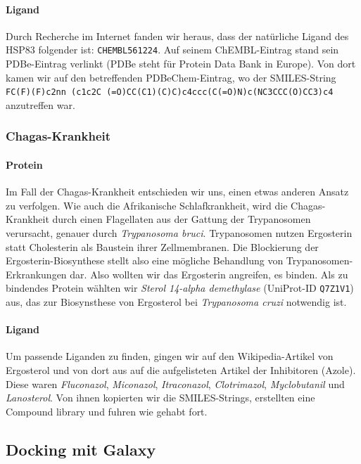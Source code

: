 \documentclass[10pt]{article}
\begin{document}
    \paragraph{Ligand}
    Durch Recherche im Internet fanden wir heraus, dass der natürliche Ligand des HSP83 folgender
    ist: \texttt{CHEMBL561224}. Auf seinem ChEMBL-Eintrag stand sein PDBe-Eintrag verlinkt (PDBe steht für Protein
    Data Bank
    in Europe). Von dort kamen wir auf den betreffenden PDBeChem-Eintrag, wo der SMILES-String \texttt{FC(F)(F)c2nn
        (c1c2C
        (=O)CC(C1)(C)C)c4ccc(C(=O)N)c(NC3CCC(O)CC3)c4} anzutreffen war.

    \subsubsection{Chagas-Krankheit}\label{subsubsec:chagas-krankheit}

    \paragraph{Protein}
    Im Fall der Chagas-Krankheit entschieden wir uns, einen etwas anderen Ansatz zu verfolgen. Wie auch die Afrikanische
    Schlafkrankheit, wird die Chagas-Krankheit durch einen Flagellaten aus der Gattung der Trypanosomen
    verursacht, genauer durch \emph{Trypanosoma bruci}.\cite{5} Trypanosomen nutzen Ergosterin statt Cholesterin
    als Baustein
    ihrer
    Zellmembranen.\cite{31} Die Blockierung der Ergosterin-Biosynthese stellt also eine mögliche Behandlung von
    Trypanosomen-Erkrankungen dar. Also wollten wir das Ergosterin angreifen, es binden. Als zu bindendes Protein
    wählten wir \emph{Sterol 14-alpha demethylase} (UniProt-ID \texttt{Q7Z1V1}) aus, das zur Biosynsthese von
    Ergosterol bei
    \emph{Trypanosoma cruzi} notwendig ist.

    \paragraph{Ligand}
    Um passende Liganden zu finden, gingen wir auf den Wikipedia-Artikel von Ergosterol und von dort aus auf die
    aufgelisteten Artikel der Inhibitoren (Azole). Diese waren \emph{Fluconazol}, \emph{Miconazol},
    \emph{Itraconazol}, \emph{Clotrimazol},
    \emph{Myclobutanil} und \emph{Lanosterol}.\cite{32, 33, 34, 35, 37} Von ihnen
    kopierten wir die SMILES-Strings, erstellten eine Compound
    library und
    fuhren wie gehabt fort.

    \subsection{Docking mit Galaxy}\label{subsec:galaxy}
\end{document}
